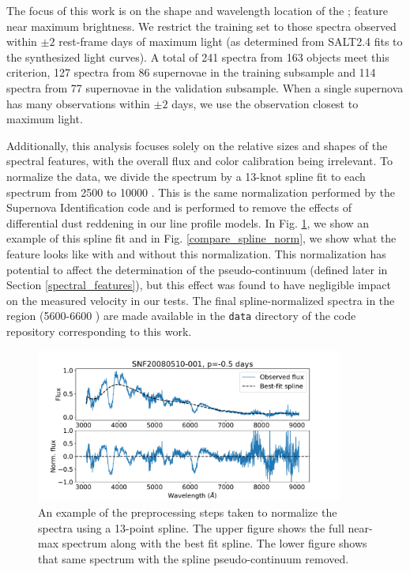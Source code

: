 The focus of this work is on the shape and wavelength location of the \siliconii; feature near maximum brightness. We restrict the training set to those spectra observed within $\pm 2$ rest-frame days of maximum light (as determined from SALT2.4 fits to the synthesized light curves). A total of 241 spectra from 163 objects meet this criterion, 127 spectra from 86 supernovae in the training subsample and 114 spectra from 77 supernovae in the validation subsample. When a single supernova has many observations within $\pm 2$ days, we use the observation closest to maximum light.

Additionally, this analysis focuses solely on the relative sizes and shapes of the spectral features, with the overall flux and color calibration being irrelevant. To normalize the data, we divide the spectrum by a 13-knot spline fit to each spectrum from 2500 \angstrom\; to 10000 \angstrom. This is the same normalization performed by the Supernova Identification code \citep[SNID,][]{blondin_type_2007} and is performed to remove the effects of differential dust reddening in our line profile models. In Fig. \ref{spline_norm_ex}, we show an example of this spline fit and in Fig. \ref{compare_spline_norm}, we show what the \siliconii\; feature looks like with and without this normalization. This normalization has potential to affect the determination of the pseudo-continuum (defined later in Section \ref{spectral_features}), but this effect was found to have negligible impact on the measured velocity in our tests. The final spline-normalized spectra in the \siliconii\; region (5600-6600 \angstrom) are made available in the \verb|data| directory of the code repository corresponding to this work.

\begin{figure}
    \centering
    \includegraphics[width=0.9\textwidth]{figures/si_feat_pca/spline_norm_ex.pdf}
    \caption{An example of the preprocessing steps taken to normalize the spectra using a 13-point spline. The upper figure shows the full near-max spectrum along with the best fit spline. The lower figure shows that same spectrum with the spline pseudo-continuum removed.}
    \label{spline_norm_ex}
\end{figure}

